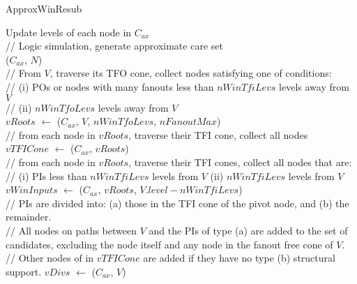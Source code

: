 \documentclass{rpt}
\begin{document}
\begin{algorithm}[H]
    \caption{\small ApproxWinResub}
    \begin{small}

        \vspace{1em}
        Update levels of each node in $C_{ax}$\\

        \vspace{1em}
        // Logic simulation, generate approximate care set\\
        \Simulate($C_{ax}$, $N$)\\

        \vspace{1em}
        // From $V$, traverse its TFO cone, collect nodes satisfying one of conditions:\\
        // (i) POs or nodes with many fanouts less than $nWinTfiLevs$ levels away from $V$\\
        // (ii) $nWinTfoLevs$ levels away from $V$\\
        $vRoots$ $\leftarrow$ \FindRoots($C_{ax}$, $V$, $nWinTfoLevs$, $nFanoutMax$)\\

        \vspace{1em}
        // from each node in $vRoots$, traverse their TFI cone, collect all nodes\\
        $vTFICone$ $\leftarrow$ \FindTFICone($C_{ax}$, $vRoots$)\\

        \vspace{1em}
        // from each node in $vRoots$, traverse their TFI cones, collect all nodes that are:\\
        // (i) PIs less than $nWinTfiLevs$ levels from $V$ (ii) $nWinTfiLevs$ levels from $V$\\
        $vWinInputs$ $\leftarrow$ \FindWinInputs($C_{ax}$, $vRoots$, $V.level - nWinTfiLevs$)\\

        \vspace{1em}
        // PIs are divided into: (a) those in the TFI cone of the pivot node, and (b) the remainder.\\
        // All nodes on paths between $V$ and the PIs of type (a) are added to the set of candidates,
        excluding the node itself and any node in the fanout free cone of $V$.\\
        // Other nodes of in $vTFICone$ are added if they have no type (b) structural support.
        $vDivs$ $\leftarrow$ \FindDivisors($C_{ax}$, $V$)\\


\end{small}
\end{algorithm}
\end{document}

